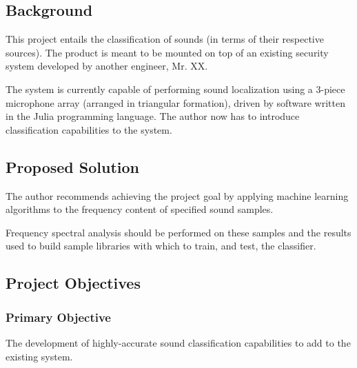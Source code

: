 \documentclass[a4paper,12pt]{article}
\numberwithin{equation}{section}
\numberwithin{figure}{section}
\numberwithin{table}{section}
\begin{document}
\subsection{Background}
This project entails the classification of sounds (in terms of their respective sources). The product is meant to be mounted on top of an existing security system developed by another engineer, Mr. XX. %

The system is currently capable of performing sound localization using a 3-piece microphone array (arranged in triangular formation), driven by software written in the Julia programming language. The author now has to introduce classification capabilities to the system.


\subsection{Proposed Solution}
The author recommends achieving the project goal by applying machine learning algorithms to the frequency content of specified sound samples.

Frequency spectral analysis should be performed on these samples and the results used to build sample libraries with which to train, and test, the classifier.





\subsection{Project Objectives}
\subsubsection{Primary Objective}
The development of highly-accurate sound classification capabilities to add to the existing system.
\end{document}
